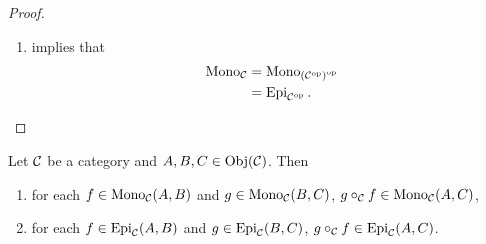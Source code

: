 \documentclass{book}
\begin{document}
\begin{proof}
\begin{enumerate}
\begin{enumerate}
\begin{align*}
					& = \bigcup\limits_{(A,B) \in \Obj(\op{\MC})^2} \Mono_{\op{\MC}}(A,B) \\
					& = \bigcup\limits_{(A,B) \in \Obj(\MC)^2} \Mono_{\op{\MC}}(A,B) \\
					& = \bigcup\limits_{(B,A) \in \Obj(\MC)^2} \Epi_{\MC}(B,A) \\
					& = \Epi_{\MC}.
				\end{align*}
				\item {} implies that 
				\begin{align*}
					\operatorname{Mono}_{\mathcal{C}}
					& = \operatorname{Mono}_{{({\mathcal{C}}^{\text{op}})}^{\text{op}}} \\
					& = \operatorname{Epi}_{{\mathcal{C}}^{\text{op}}}.
				\end{align*}
			\end{enumerate}
		\end{enumerate}
	\end{proof}
	
	\begin{ex}
		Let $\mathcal{C}$ be a category and $A,B,C \in \operatorname{Obj}(\mathcal{C})$. Then 
		\begin{enumerate}
			\item for each $f \in \operatorname{Mono}_{\mathcal{C}}(A,B)$ and $g \in \operatorname{Mono}_{\mathcal{C}}(B,C)$, $g \circ_{\mathcal{C}} f \in \operatorname{Mono}_{\mathcal{C}}(A,C)$,
			\item for each $f \in \operatorname{Epi}_{\mathcal{C}}(A,B)$ and $g \in \operatorname{Epi}_{\mathcal{C}}(B,C)$, $g \circ_{\mathcal{C}} f \in \operatorname{Epi}_{\mathcal{C}}(A,C)$. 
		\end{enumerate}
	\end{ex}
	
\end{document}
